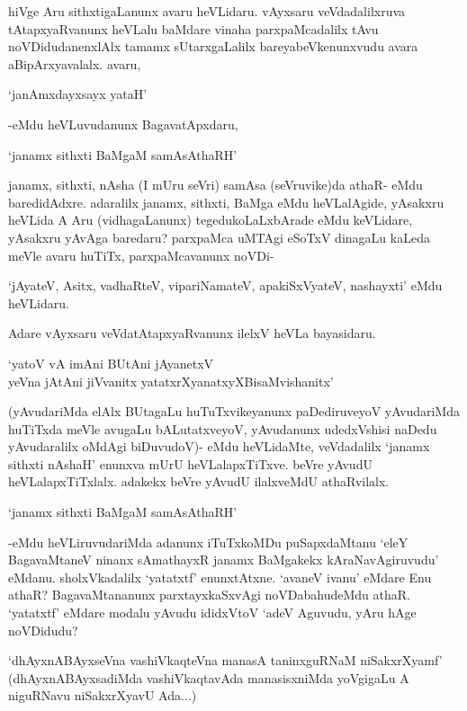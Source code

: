 hiVge Aru sithxtigaLanunx avaru heVLidaru. vAyxsaru veVdadalilxruva tAtapxyaRvanunx heVLalu baMdare vinaha parxpaMcadalilx tAvu noVDidudanenxlAlx tamamx sUtarxgaLalilx bareyabeVkenunxvudu avara aBipArxyavalalx. avaru,


\begin{shloka}
`janAmxdayxsayx yataH'
\end{shloka}

-eMdu heVLuvudanunx BagavatApxdaru,

\begin{shloka}
`janamx sithxti BaMgaM samAsAthaRH'
\end{shloka}

janamx, sithxti, nAsha (I mUru seVri) samAsa (seVruvike)da athaR- eMdu baredidAdxre. adaralilx janamx, sithxti, BaMga eMdu heVLalAgide, yAsakxru heVLida A Aru (vidhagaLanunx) tegedukoLaLxbArade eMdu keVLidare, yAsakxru yAvAga baredaru? parxpaMca uMTAgi eSoTxV dinagaLu kaLeda meVle avaru huTiTx, parxpaMcavanunx noVDi-

`jAyateV, Asitx, vadhaRteV, vipariNamateV, apakiSxVyateV, nashayxti' eMdu heVLidaru.

Adare vAyxsaru veVdatAtapxyaRvanunx ilelxV heVLa bayasidaru.

\begin{shloka}
`yatoV vA imAni BUtAni jAyanetxV\\
yeVna jAtAni jiVvanitx yatatxrXyanatxyXBisaMvishanitx'
\end{shloka}

(yAvudariMda elAlx BUtagaLu huTuTxvikeyanunx paDediruveyoV yAvu\-da\-riM\-da huTiTxda meVle avugaLu bALutatxveyoV, yAvudanunx udedxVshisi naDedu yAvudaralilx oMdAgi biDuvudoV)- eMdu heVLidaMte, veVdadalilx `janamx sithxti nAshaH' enunxva mUrU heVLalapxTiTxve. beVre yAvudU heVLalapxTiTxlalx. adakekx beVre yAvudU ilalxveMdU athaRvilalx.

\begin{shloka}
`janamx sithxti BaMgaM samAsAthaRH'
\end{shloka}

-eMdu heVLiruvudariMda adanunx iTuTxkoMDu puSapxdaMtanu `eleY BagavaMtaneV ninanx sAmathayxR janamx BaMgakekx kAraNavAgiruvudu' eMdanu. sholxVkadalilx `yatatxtf' enunxtAtxne. `avaneV ivanu' eMdare Enu athaR? BagavaMtananunx parxtayxkaSxvAgi noVDabahudeMdu athaR. `yatatxtf' eMdare modalu yAvudu ididxVtoV `adeV Aguvudu, yAru hAge noVDidudu?

`dhAyxnABAyxseVna vashiVkaqteVna manasA taninxguRNaM niSakxrXyamf' (dhAyxnABAyxsadiMda vashiVkaqtavAda manasisxniMda yoVgigaLu A niguRNavu niSakxrXyavU Ada$\ldots$)

